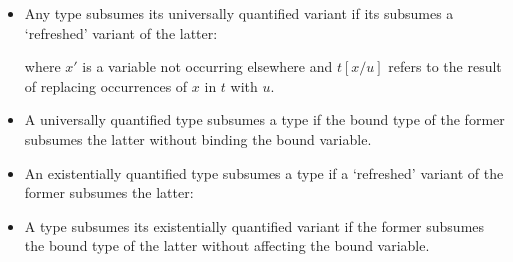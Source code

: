 \begin{itemize}
\item Any type subsumes its universally quantified variant if its subsumes a `refreshed' variant of the latter:

\begin{prooftree}
\end{prooftree}
where $x'$ is a variable not occurring elsewhere and $t[x/u]$ refers to the result of replacing occurrences of $x$ in $t$ with $u$.


\item A universally quantified type subsumes a type if the bound type of the former subsumes the latter without binding the bound variable.

\begin{prooftree}
\end{prooftree}

\item An existentially quantified type subsumes a type if a `refreshed' variant of the 
former subsumes the latter:

\begin{prooftree}
\end{prooftree}

\item A type subsumes its existentially quantified variant if 
the former subsumes the bound type of the latter without affecting the bound variable.

\begin{prooftree}
\end{prooftree}

\end{itemize}


